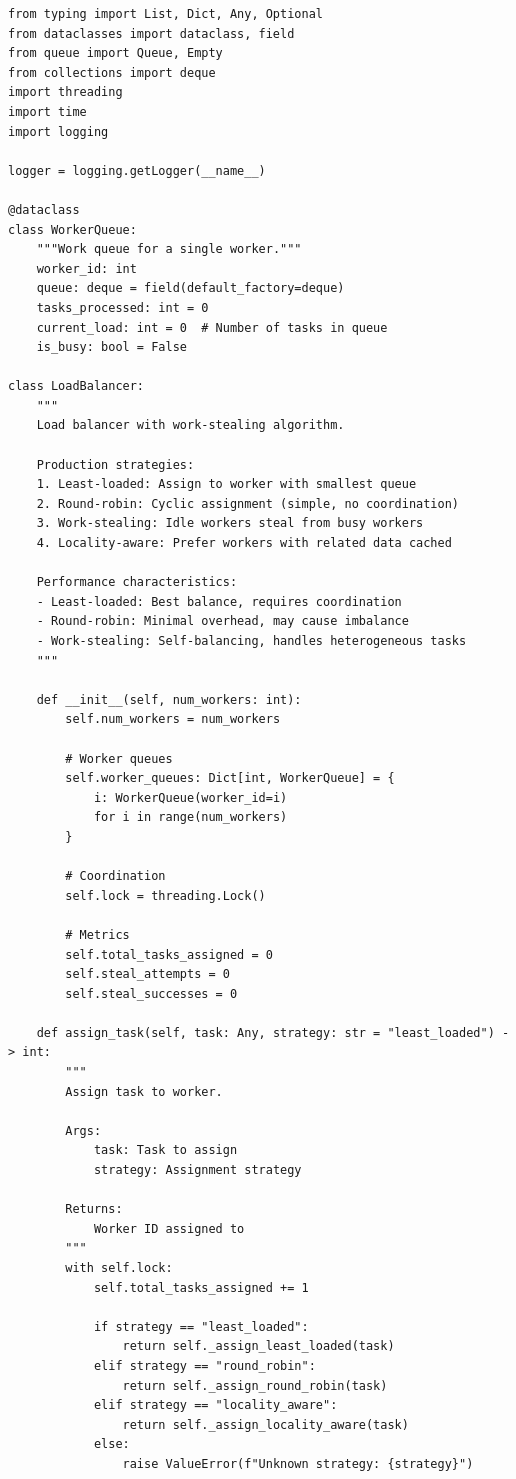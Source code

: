 \begin{lstlisting}[style=python, caption={Load Balancer with Work Stealing}]
from typing import List, Dict, Any, Optional
from dataclasses import dataclass, field
from queue import Queue, Empty
from collections import deque
import threading
import time
import logging

logger = logging.getLogger(__name__)

@dataclass
class WorkerQueue:
    """Work queue for a single worker."""
    worker_id: int
    queue: deque = field(default_factory=deque)
    tasks_processed: int = 0
    current_load: int = 0  # Number of tasks in queue
    is_busy: bool = False

class LoadBalancer:
    """
    Load balancer with work-stealing algorithm.

    Production strategies:
    1. Least-loaded: Assign to worker with smallest queue
    2. Round-robin: Cyclic assignment (simple, no coordination)
    3. Work-stealing: Idle workers steal from busy workers
    4. Locality-aware: Prefer workers with related data cached

    Performance characteristics:
    - Least-loaded: Best balance, requires coordination
    - Round-robin: Minimal overhead, may cause imbalance
    - Work-stealing: Self-balancing, handles heterogeneous tasks
    """

    def __init__(self, num_workers: int):
        self.num_workers = num_workers

        # Worker queues
        self.worker_queues: Dict[int, WorkerQueue] = {
            i: WorkerQueue(worker_id=i)
            for i in range(num_workers)
        }

        # Coordination
        self.lock = threading.Lock()

        # Metrics
        self.total_tasks_assigned = 0
        self.steal_attempts = 0
        self.steal_successes = 0

    def assign_task(self, task: Any, strategy: str = "least_loaded") -> int:
        """
        Assign task to worker.

        Args:
            task: Task to assign
            strategy: Assignment strategy

        Returns:
            Worker ID assigned to
        """
        with self.lock:
            self.total_tasks_assigned += 1

            if strategy == "least_loaded":
                return self._assign_least_loaded(task)
            elif strategy == "round_robin":
                return self._assign_round_robin(task)
            elif strategy == "locality_aware":
                return self._assign_locality_aware(task)
            else:
                raise ValueError(f"Unknown strategy: {strategy}")


\end{lstlisting}
